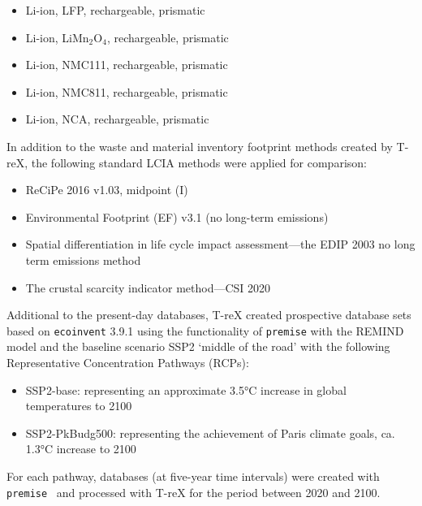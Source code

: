\documentclass[a4paper,fleqn]{cas-dc}
\begin{document}
\begin{itemize}
	\item Li-ion, LFP, rechargeable, prismatic
	\item Li-ion, LiMn\(_2\)O\(_4\), rechargeable, prismatic
	\item Li-ion, NMC111, rechargeable, prismatic
	\item Li-ion, NMC811, rechargeable, prismatic
	\item Li-ion, NCA, rechargeable, prismatic
\end{itemize}

In addition to the waste and material inventory footprint methods created by
T-reX, the following standard LCIA methods were applied for comparison:

\begin{itemize}
	\item ReCiPe 2016 v1.03, midpoint (I)~\citep{huijbregts2016recipe}
	\item Environmental Footprint (EF) v3.1 (no long-term emissions)~\citep{eu2023ef}
	\item Spatial differentiation in life cycle impact assessment---the EDIP 2003 no long term emissions method~\citep{hauschild2003edip}
	\item The crustal scarcity indicator method---CSI 2020~\citep{arvidsson2020csi}
\end{itemize}

Additional to the present-day databases, T-reX created prospective database
sets based on \texttt{ecoinvent} 3.9.1 using the functionality of
\texttt{premise} with the REMIND model and the baseline scenario SSP2 `middle
of the road' with the following Representative Concentration Pathways (RCPs):
\begin{itemize}
	\item SSP2-base: representing an approximate 3.5°C increase in global temperatures to
	      2100
	\item SSP2-PkBudg500: representing the achievement of Paris climate goals, ca. 1.3°C
	      increase to 2100
\end{itemize}

For each pathway, databases (at five-year time intervals) were created with
\texttt{premise}~\citep{sacchi2022premise} and processed with T-reX for the
period between 2020 and 2100.
\end{document}
